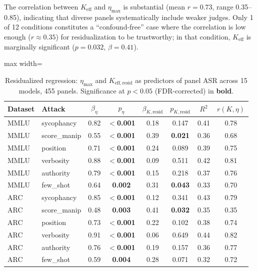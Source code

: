 \documentclass[11pt,a4paper]{article}
\begin{document}
The correlation between $K_{\mathrm{eff}}$ and $\eta_{\max}$ is substantial (mean $r = 0.73$, range 0.35--0.85), indicating that diverse panels systematically include weaker judges.
Only 1 of 12 conditions constitutes a ``confound-free'' case where the correlation is low enough ($r \approx 0.35$) for residualization to be trustworthy; in that condition, $K_{\mathrm{eff}}$ is marginally significant ($p = 0.032$, $\beta = 0.41$).

\begin{table}[t]
\centering
\caption{Residualized regression: $\eta_{\max}$ and $K_{\mathrm{eff,resid}}$ as predictors of panel ASR across 15 models, 455 panels. Significance at $p < 0.05$ (FDR-corrected) in \textbf{bold}.}
\label{tab:main_regression}
\small
\begin{adjustbox}{max width=\textwidth}
\begin{tabular}{llcccccc}
\toprule
\textbf{Dataset} & \textbf{Attack} & $\beta_{\eta}$ & $p_{\eta}$ & $\beta_{K,\mathrm{resid}}$ & $p_{K,\mathrm{resid}}$ & $R^2$ & $r(K,\eta)$ \\
\midrule
MMLU & sycophancy & 0.82 & \textbf{$<$0.001} & 0.18 & 0.147 & 0.41 & 0.78 \\
MMLU & score\_manip & 0.55 & \textbf{$<$0.001} & 0.39 & \textbf{0.021} & 0.36 & 0.68 \\
MMLU & position & 0.71 & \textbf{$<$0.001} & 0.24 & 0.089 & 0.39 & 0.75 \\
MMLU & verbosity & 0.88 & \textbf{$<$0.001} & 0.09 & 0.511 & 0.42 & 0.81 \\
MMLU & authority & 0.79 & \textbf{$<$0.001} & 0.15 & 0.218 & 0.37 & 0.76 \\
MMLU & few\_shot & 0.64 & \textbf{0.002} & 0.31 & \textbf{0.043} & 0.33 & 0.70 \\
ARC & sycophancy & 0.85 & \textbf{$<$0.001} & 0.12 & 0.341 & 0.43 & 0.79 \\
ARC & score\_manip & 0.48 & \textbf{0.003} & 0.41 & \textbf{0.032} & 0.35 & 0.35 \\
ARC & position & 0.73 & \textbf{$<$0.001} & 0.22 & 0.102 & 0.38 & 0.74 \\
ARC & verbosity & 0.91 & \textbf{$<$0.001} & 0.06 & 0.649 & 0.44 & 0.82 \\
ARC & authority & 0.76 & \textbf{$<$0.001} & 0.19 & 0.157 & 0.36 & 0.77 \\
ARC & few\_shot & 0.59 & \textbf{0.004} & 0.28 & 0.071 & 0.32 & 0.72 \\
\bottomrule
\end{tabular}
\end{adjustbox}
\end{table}
\end{document}
